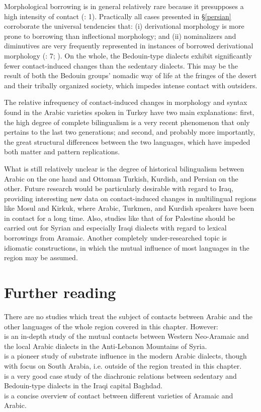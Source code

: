 \documentclass[output=paper]{langsci/langscibook}
\begin{document}
Morphological borrowing is in general relatively rare because it presupposes a high intensity of contact (\citealt{GardaniArkadievAmiridze2015}: 1). Practically all cases presented in §\ref{persian} corroborate the universal tendencies that: (i) derivational morphology is more prone to borrowing than inflectional morphology; and (ii) nominalizers and diminutives are very frequently represented in instances of borrowed derivational morphology (\citealt{GardaniArkadievAmiridze2015}: 7; \citealt{Seifart2013}). On the whole, the Bedouin-type dialects exhibit significantly fewer contact-induced changes than the sedentary dialects. This may be the result of both the Bedouin groups' nomadic way of life at the fringes of the desert and their tribally organized society, which impedes intense contact with outsiders.

The relative infrequency of contact-induced changes in morphology and syntax found in the Arabic varieties spoken in Turkey have two main explanations: first, the high degree of complete bilingualism is a very recent phenomenon that only pertains to the last two generations; and second, and probably more importantly, the great structural differences between the two languages, which have impeded both matter and pattern replications.

What is still relatively unclear is the degree of historical bilingualism between Arabic on the one hand and Ottoman Turkish, Kurdish, and Persian on the other. Future research would be particularly desirable with regard to Iraq, providing interesting new data on contact-induced changes in multilingual regions like Mosul and Kirkuk, where Arabic, Turkmen, and Kurdish speakers have been in contact for a long time. Also, studies like that of  \citet{Neishtadt2015} for Palestine should be carried out for Syrian and especially Iraqi dialects with regard to lexical borrowings from Aramaic. Another completely under-researched topic is idiomatic constructions, in which the mutual influence of most languages in the region may be assumed.

\section*{Further reading}

There are no studies which treat the subject of contacts between Arabic and the other languages of the whole region covered in this chapter. However:\\
\citet{ArnoldBehnstedt1993} is an in-depth study of the mutual contacts between Western Neo-Aramaic and the local Arabic dialects in the Anti-Lebanon Mountains of Syria.\\
\citet{Diem1979} is a pioneer study of substrate influence in the modern Arabic dialects, though with focus on South Arabia, i.e. outside of the region treated in this chapter.\\
\citet{Palva2009} is a very good case study of the diachronic relations between sedentary and Bedouin-type dialects in the Iraqi capital Baghdad.\\
\citet{Weninger2011Aramaic} is a concise overview of contact between different varieties of Aramaic and Arabic.
\end{document}
